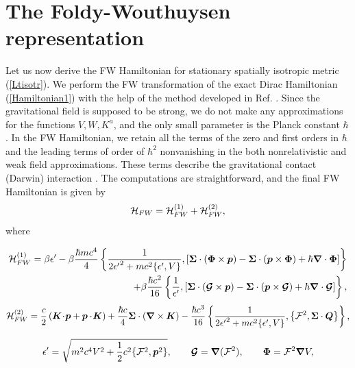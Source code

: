 \documentclass[preprint,showpacs,preprintnumbers,eqsecnum,amsmath,amssymb]{revtex4}
\begin{document}
\section{The Foldy-Wouthuysen representation}\label{FW1}


Let us now derive the FW Hamiltonian for stationary spatially
isotropic metric (\ref{Ltisotr}). We perform the FW transformation
of the exact Dirac Hamiltonian (\ref{Hamiltonian1}) with the help
of the method developed in Ref. \cite{PRA}. Since the
gravitational field is supposed to be strong, we do not make any
approximations for the functions $V, W, K^a$, and the only small
parameter is the Planck constant $\hbar$. In the FW Hamiltonian,
we retain all the terms of the zero and first orders in $\hbar$
and the leading terms of order of $\hbar^2$ nonvanishing in the
both nonrelativistic and weak field approximations.
These terms describe the gravitational contact (Darwin)
interaction \cite{PRD}. The computations are straightforward, and
the final FW Hamiltonian is given by
\begin{equation}
{\cal H}_{FW}={\cal H}_{FW}^{(1)}+{\cal H}_{FW}^{(2)},\label{eqFW}
\end{equation} 
where
\begin{widetext}
\begin{eqnarray}
{\cal H}_{FW}^{(1)}=\beta\epsilon' - \beta\frac{\hbar mc^4}{4}\left\{
\frac{1}{2{\epsilon'}^2+mc^2\{\epsilon',V\}},\left[\bm{\Sigma}\cdot(\bm\Phi
\times\bm{p})-\bm{\Sigma}\cdot(\bm{p}\times
\bm\Phi)+\hbar\bm\nabla\cdot\bm\Phi\right]\right\}\nonumber\\
+ \beta\frac{\hbar c^2}{16}\left\{ \frac{1}{\epsilon'
},\left[\bm{\Sigma}\cdot (\mbox{\boldmath ${\cal G}$}\times\bm p)-
\bm{\Sigma}\cdot(\bm{p}\times\mbox{\boldmath ${\cal G}$})
+\hbar\bm\nabla\cdot\mbox{\boldmath ${\cal G}$}\right]\right\},\label{eq7}
\end{eqnarray}
\begin{eqnarray}
{\cal H}_{FW}^{(2)}=\frac c2\left(\bm K\!\cdot\!\bm p+\bm p\cdot\!\bm K\right) 
+\frac{\hbar c}{4}\bm\Sigma\cdot(\bm\nabla\times\bm K)-\frac{\hbar
c^3}{16}\left\{\frac{1}{2{\epsilon'}^2+mc^2\{\epsilon',V\}},\left\{{\cal
F}^2,\bm{\Sigma}\cdot \bm Q\right\}\right\}, \label{eq7K}
\end{eqnarray}
\end{widetext}
\begin{equation}
\epsilon'=\sqrt{m^2c^4V^2+\frac12c^2\{{\cal F}^2,\bm p^2\}},\qquad
\mbox{\boldmath ${\cal G}$}=\bm\nabla({\cal F}^2),\qquad
\bm{\Phi}={\cal F}^2 \bm\nabla V,\label{eqa}
\end{equation}
\end{document}
